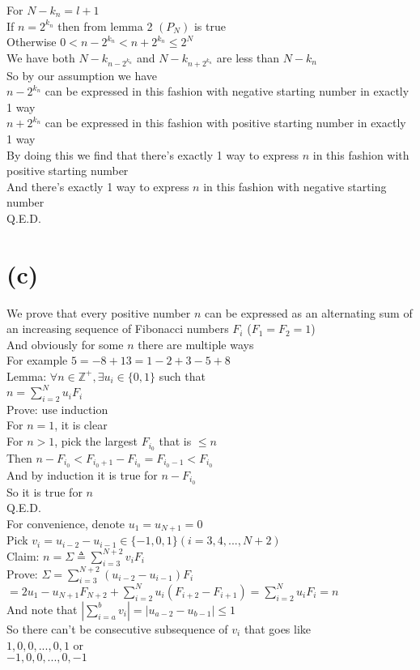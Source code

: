 \documentclass{article}
\begin{document}
For $N-k_n=l+1$\\
If $n=2^{k_n}$ then from lemma 2 $(P_N)$ is true\\
Otherwise $0<n-2^{k_n}<n+2^{k_n}\le 2^N$\\
We have both $N-k_{n-2^{k_n}}$ and $N-k_{n+2^{k_n}}$ are less than $N-k_n$\\
So by our assumption we have\\
$n-2^{k_n}$ can be expressed in this fashion with negative starting number in exactly 1 way\\
$n+2^{k_n}$ can be expressed in this fashion with positive starting number in exactly 1 way\\
By doing this we find that there's exactly 1 way to express $n$ in this fashion with positive starting number\\
And there's exactly 1 way to express $n$ in this fashion with negative starting number\\
Q.E.D.
\section{(c)}
We prove that every positive number $n$ can be expressed as an alternating sum of an increasing sequence of Fibonacci numbers $F_i$ ($F_1=F_2=1$)\\
And obviously for some $n$ there are multiple ways\\
For example $5=-8+13=1-2+3-5+8$\\[22pt]
Lemma: $\forall n\in \mathbb{Z}^+,\exists u_i\in \{0,1\}$ such that\\
$n=\sum\limits_{i=2}^N u_i F_i$\\
Prove: use induction\\
For $n=1$, it is clear\\
For $n>1$, pick the largest $F_{i_0}$ that is $\le n$\\
Then $n-F_{i_0}<F_{i_0+1}-F_{i_0}=F_{i_0-1}<F_{i_0}$\\
And by induction it is true for $n-F_{i_0}$\\
So it is true for $n$\\
Q.E.D.\\
For convenience, denote $u_1=u_{N+1}=0$\\
Pick $v_i=u_{i-2}-u_{i-1}\in \{-1,0,1\}(i=3,4,...,N+2)$\\
Claim: $n=\Sigma\triangleq\sum\limits_{i=3}^{N+2} v_i F_i$\\
Prove: $\Sigma=\sum\limits_{i=3}^{N+2}(u_{i-2}-u_{i-1})F_i$\\
$=2u_1-u_{N+1}F_{N+2}+\sum\limits_{i=2}^N u_i(F_{i+2}-F_{i+1})=\sum\limits_{i=2}^N u_i F_i=n$\\
And note that $|\sum\limits_{i=a}^b v_i|=|u_{a-2}-u_{b-1}|\le 1$\\
So there can't be consecutive subsequence  of $v_i$ that goes like\\
$1,0,0,...,0,1$ or\\
$-1,0,0,...,0,-1$
\end{document}
